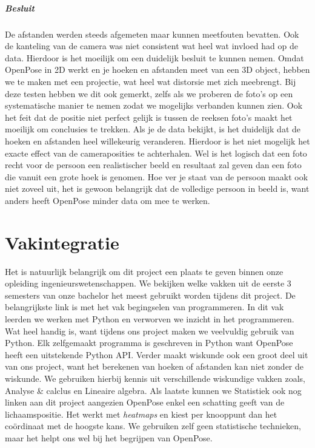 \documentclass[a4paper,twoside,kulak]{kulakreport}
\begin{document}
\paragraph{Besluit}
De afstanden werden steeds afgemeten maar kunnen meetfouten bevatten. Ook de kanteling van de camera was niet consistent wat heel wat invloed had op de data. Hierdoor is het moeilijk om een duidelijk besluit te kunnen nemen. Omdat OpenPose in 2D werkt en je hoeken en afstanden meet van een 3D object, hebben we te maken met een projectie, wat heel wat distorsie met zich meebrengt. Bij deze testen hebben we dit ook gemerkt, zelfs als we proberen de foto’s op een systematische manier te nemen zodat we mogelijks verbanden kunnen zien. Ook het feit dat de positie niet perfect gelijk is tussen de reeksen foto’s maakt het moeilijk om conclusies te trekken. Als je de data bekijkt, is het duidelijk dat de hoeken en afstanden heel willekeurig veranderen. Hierdoor is het niet mogelijk het exacte effect van de cameraposities te achterhalen. Wel is het logisch dat een foto recht voor de persoon een realistischer beeld en resultaat zal geven dan een foto die vanuit een grote hoek is genomen. Hoe ver je staat van de persoon maakt ook niet zoveel uit, het is gewoon belangrijk dat de volledige persoon in beeld is, want anders heeft OpenPose minder data om mee te werken.

 
\chapter{Vakintegratie}
Het is natuurlijk belangrijk om dit project een plaats te geven binnen onze opleiding ingenieurswetenschappen. We bekijken welke vakken uit de eerste 3 semesters van onze bachelor het meest gebruikt worden tijdens dit project. De belangrijkste link is met het vak begingselen van programmeren. In dit vak leerden we werken met Python en verworven we inzicht in het programmeren. Wat heel handig is, want tijdens ons project maken we veelvuldig gebruik van Python. Elk zelfgemaakt programma is geschreven in Python want OpenPose heeft een uitstekende Python API. Verder maakt wiskunde ook een groot deel uit van ons project, want het berekenen van hoeken of afstanden kan niet zonder de wiskunde. We gebruiken hierbij kennis uit verschillende wiskundige vakken zoals, Analyse \& calclus en Lineaire algebra. Als laatste kunnen we Statistiek ook nog linken aan dit project aangezien OpenPose enkel een schatting geeft van de lichaamspositie. Het werkt met \textit{heatmaps} en kiest per knooppunt dan het coördinaat met de hoogste kans. We gebruiken zelf geen statistische technieken, maar het helpt ons wel bij het begrijpen van OpenPose.
\end{document}
